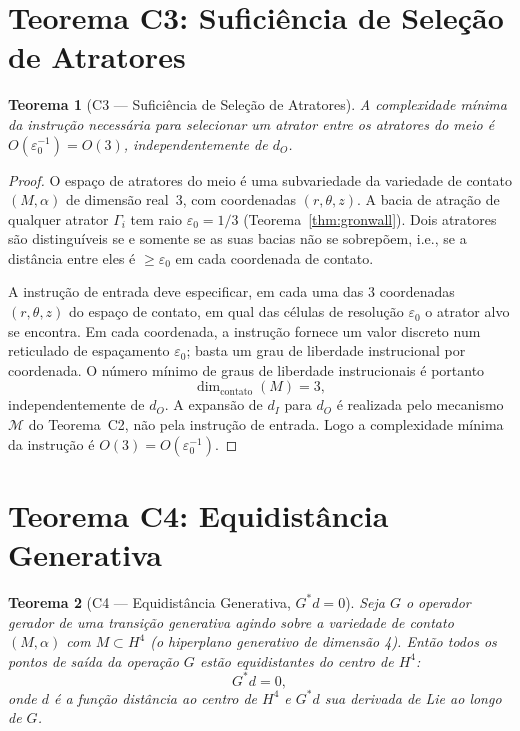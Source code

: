 \documentclass[12pt,a4paper,twoside]{book}
\theoremstyle{plain}
\newtheorem{teorema}{Teorema}[section]
\theoremstyle{definition}
\theoremstyle{definition}
\newcommand{\epsz}{\varepsilon_{0}}
\begin{document}
\section{Teorema C3: Suficiência de Seleção de Atratores}
\label{sec:C3}

\begin{teorema}[C3 — Suficiência de Seleção de Atratores]\label{thm:C3}
A complexidade mínima da instrução necessária para selecionar um atrator
entre os atratores do meio é $O(\epsz^{-1}) = O(3)$, independentemente
de $d_{O}$.
\end{teorema}

\begin{proof}
O espaço de atratores do meio é uma subvariedade da variedade de contato
$(M,\alpha)$ de dimensão real~3, com coordenadas $(r,\theta,z)$. A bacia
de atração de qualquer atrator $\Gamma_{i}$ tem raio $\epsz = 1/3$
(Teorema~\ref{thm:gronwall}). Dois atratores são distinguíveis se e somente
se as suas bacias não se sobrepõem, i.e., se a distância entre eles é
$\ge \epsz$ em cada coordenada de contato.

A instrução de entrada deve especificar, em cada uma das 3 coordenadas
$(r,\theta,z)$ do espaço de contato, em qual das células de resolução
$\epsz$ o atrator alvo se encontra. Em cada coordenada, a instrução
fornece um valor discreto num reticulado de espaçamento $\epsz$; basta
um grau de liberdade instrucional por coordenada. O número mínimo de
graus de liberdade instrucionais é portanto
\[
  \dim_{\mathrm{contato}}(M) = 3,
\]
independentemente de $d_{O}$. A expansão de $d_{I}$ para $d_{O}$ é
realizada pelo mecanismo $\mathcal{M}$ do Teorema~C2, não pela instrução
de entrada. Logo a complexidade mínima da instrução é $O(3) = O(\epsz^{-1})$.
\end{proof}

\section{Teorema C4: Equidistância Generativa}
\label{sec:C4}

\begin{teorema}[C4 — Equidistância Generativa, $G^{*}d = 0$]\label{thm:C4}
Seja $G$ o operador gerador de uma transição generativa agindo sobre a
variedade de contato $(M,\alpha)$ com $M \subset H^{4}$ (o hiperplano
generativo de dimensão 4). Então todos os pontos de saída da operação
$G$ estão equidistantes do centro de $H^{4}$:
\[
  G^{*} d = 0,
\]
onde $d$ é a função distância ao centro de $H^{4}$ e $G^{*}d$ sua
derivada de Lie ao longo de $G$.
\end{teorema}
\end{document}
